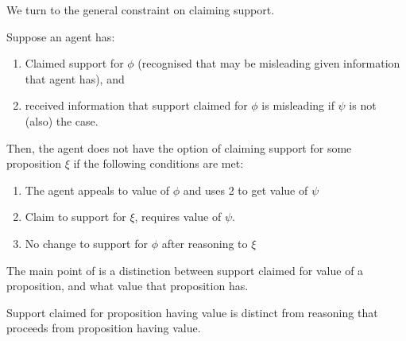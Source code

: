 \begin{note}
  We turn to the general constraint on claiming support.
  \begin{proposition}[\nI{-}  --- \nI{}]\label{prem:ni}
    Suppose an agent has:
    \begin{enumerate}
    \item Claimed support for \(\phi\) (recognised that may be misleading given information that agent has), and
    \item received information that support claimed for \(\phi\) is misleading if \(\psi\) is not (also) the case.
    \end{enumerate}
    Then, the agent does not have the option of claiming support for some proposition \(\xi\) if the following conditions are met:
    \begin{enumerate}
    \item The agent appeals to value of \(\phi\) and uses 2 to get value of \(\psi\)
    \item Claim to support for \(\xi\), requires value of \(\psi\).
    \item No change to support for \(\phi\) after reasoning to \(\xi\)
    \end{enumerate}
  \end{proposition}

  The main point of \nI{} is a distinction between support claimed for value of a proposition, and what value that proposition has.

  Support claimed for proposition having value is distinct from reasoning that proceeds from proposition having value.


\end{note}

